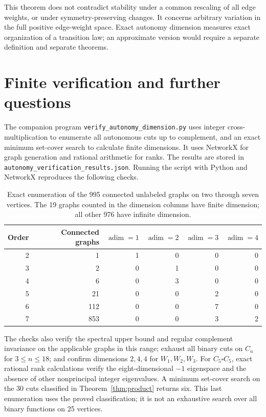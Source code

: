 \documentclass[11pt]{article}
\theoremstyle{definition}
\newcommand{\adim}{\operatorname{adim}}
\numberwithin{equation}{section}
\begin{document}
This theorem does not contradict stability under a common rescaling of all
edge weights, or under symmetry-preserving changes. It concerns arbitrary
variation in the full positive edge-weight space. Exact autonomy dimension
measures exact organization of a transition law; an approximate version
would require a separate definition and separate theorems.

\section{Finite verification and further questions}

The companion program \texttt{verify\_autonomy\_dimension.py} uses integer
cross-multiplication to enumerate all autonomous cuts up to complement,
and an exact minimum set-cover search to calculate finite dimensions.
It uses NetworkX for graph generation and rational arithmetic for ranks.
The results are stored in \texttt{autonomy\_verification\_results.json}.
Running the script with Python and NetworkX reproduces the following checks.

\begin{table}[ht]
\centering
\begin{tabular}{rrrrrr}
\toprule
Order & Connected graphs & $\adim=1$ & $\adim=2$ & $\adim=3$ & $\adim=4$\\
\midrule
2&1&1&0&0&0\\
3&2&0&1&0&0\\
4&6&0&3&0&0\\
5&21&0&0&2&0\\
6&112&0&0&7&0\\
7&853&0&0&3&2\\
\bottomrule
\end{tabular}
\caption{Exact enumeration of the 995 connected unlabeled graphs on two
through seven vertices. The 19 graphs counted in the dimension columns
have finite dimension; all other 976 have infinite dimension.}
\end{table}

The checks also verify the spectral upper bound and regular complement
invariance on the applicable graphs in this range; exhaust all binary
cuts on $C_n$ for $3\leq n\leq18$; and confirm dimensions $2,4,4$ for
$W_1,W_2,W_3$. For $C_5\square C_5$, exact rational rank calculations
verify the eight-dimensional $-1$ eigenspace and the absence of other
nonprincipal integer eigenvalues. A minimum set-cover search on the
30 cuts classified in Theorem~\ref{thm:product} returns six. This last
enumeration uses the proved classification; it is not an exhaustive
search over all binary functions on 25 vertices.
\end{document}
